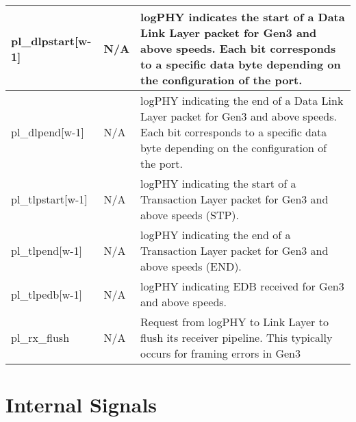 \begin{table}[H]

    \centering
  \begin{tabular}{ |m{26mm}|P{18mm}|m{60mm}|  }
  \hline

pl\_dlpstart[w-1] &N/A & logPHY indicates the start of a Data Link Layer packet for Gen3 and above speeds. Each
bit corresponds to a specific data byte depending on the configuration of the port.\\ \hline 
pl\_dlpend[w-1] &N/A & logPHY indicating the end of a Data Link Layer packet for Gen3 and above speeds. Each
bit corresponds to a specific data byte depending on the configuration of the port.\\ \hline
pl\_tlpstart[w-1] &N/A &logPHY indicating the start of a Transaction Layer packet for Gen3 and above speeds
(STP). \\ \hline
pl\_tlpend[w-1] &N/A & logPHY indicating the end of a Transaction Layer packet for Gen3 and above speeds
(END).\\ \hline
pl\_tlpedb[w-1] &N/A & logPHY indicating EDB received for Gen3 and above speeds. \\ \hline
pl\_rx\_flush &N/A & Request from logPHY to Link Layer to flush its receiver pipeline. This typically occurs for
framing errors in Gen3\\ \hline

\end{tabular}
\end{table}
\section{Internal Signals}

